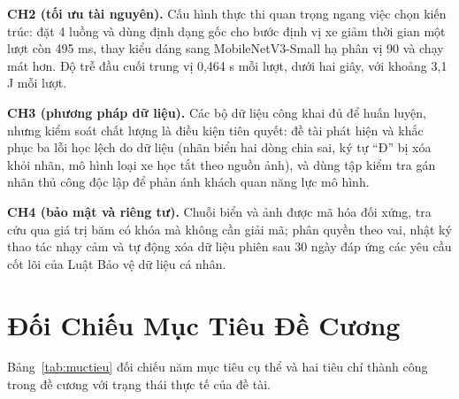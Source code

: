 \textbf{CH2 (tối ưu tài nguyên).} Cấu hình thực thi quan trọng ngang việc chọn kiến trúc: đặt
4 luồng và dùng định dạng gốc cho bước định vị xe giảm thời gian một lượt còn 495 ms, thay
kiểu dáng sang MobileNetV3-Small hạ phân vị 90 và chạy mát hơn. Độ trễ đầu cuối trung vị
0,464 s mỗi lượt, dưới hai giây, với khoảng 3,1 J mỗi lượt.

\textbf{CH3 (phương pháp dữ liệu).} Các bộ dữ liệu công khai đủ để huấn luyện, nhưng kiểm
soát chất lượng là điều kiện tiên quyết: đề tài phát hiện và khắc phục ba lỗi học lệch do dữ
liệu (nhãn biển hai dòng chia sai, ký tự ``Đ'' bị xóa khỏi nhãn, mô hình loại xe học tắt theo
nguồn ảnh), và dùng tập kiểm tra gán nhãn thủ công độc lập để phản ánh khách quan năng lực mô
hình.

\textbf{CH4 (bảo mật và riêng tư).} Chuỗi biển và ảnh được mã hóa đối xứng, tra cứu qua giá
trị băm có khóa mà không cần giải mã; phân quyền theo vai, nhật ký thao tác nhạy cảm và tự
động xóa dữ liệu phiên sau 30 ngày đáp ứng các yêu cầu cốt lõi của Luật Bảo vệ dữ liệu cá
nhân.

\section{Đối Chiếu Mục Tiêu Đề Cương}

Bảng~\ref{tab:muctieu} đối chiếu năm mục tiêu cụ thể và hai tiêu chí thành công trong đề cương
với trạng thái thực tế của đề tài.

